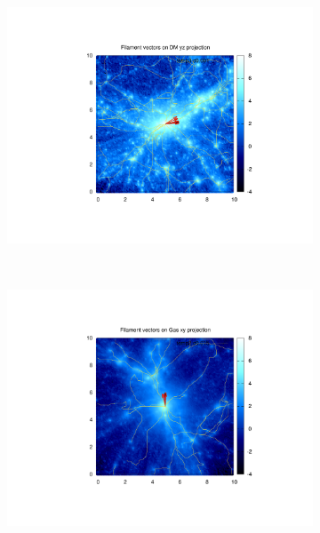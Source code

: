 \documentclass[journal]{IEEEtran}
\begin{document}
\begin{figure}[!t]
\begin{subfigure}[t]{0.3\textwidth}
		\includegraphics[width=\linewidth]{FilyzDM}
	\end{subfigure}
	\\
	\begin{subfigure}[t]{0.3\textwidth}
		\centering
		\includegraphics[width=\linewidth]{FilxyGas}
	\end{subfigure}
	\quad
	\begin{subfigure}[t]{0.3\textwidth}
		\centering

\end{subfigure}
\end{figure}
\end{document}
